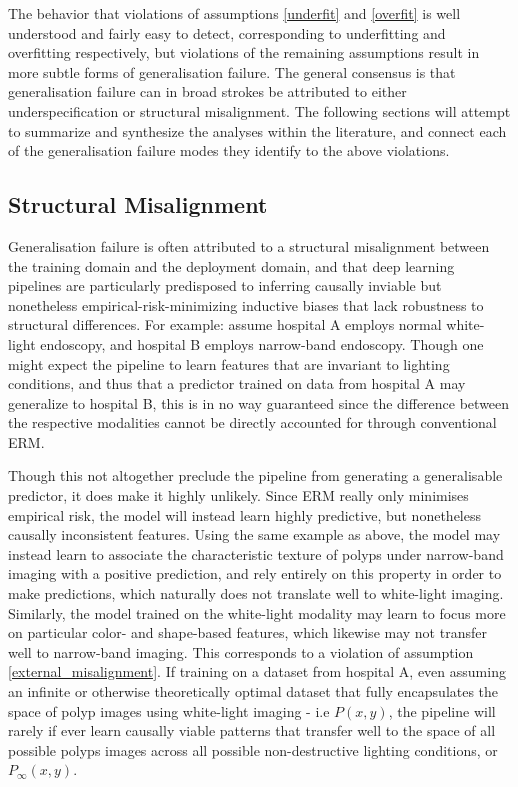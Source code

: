 		The behavior that violations of assumptions \ref{underfit} and \ref{overfit} is well understood and fairly easy to detect, corresponding to underfitting and overfitting respectively, but violations of the remaining assumptions result in more subtle forms of generalisation failure. The general consensus is that generalisation failure can in broad strokes be attributed to either underspecification or structural misalignment. The following sections will attempt to summarize and synthesize the analyses within the literature, and connect each of the generalisation failure modes they identify to the above violations.
		
		\subsection{Structural Misalignment}
		Generalisation failure is often attributed to a structural misalignment between the training domain and the deployment domain, and that deep learning pipelines are particularly predisposed to inferring causally inviable but nonetheless empirical-risk-minimizing inductive biases that lack robustness to structural differences. For example: assume hospital A employs normal white-light endoscopy, and hospital B employs narrow-band endoscopy. Though one might expect the pipeline to learn features that are invariant to lighting conditions, and thus that a predictor trained on data from hospital A may generalize to hospital B, this is in no way guaranteed since the difference between the respective modalities cannot be directly accounted for through conventional ERM. 
		
		Though this not altogether preclude the pipeline from generating a generalisable predictor, it does make it highly unlikely. Since ERM really only minimises empirical risk, the model will instead learn highly predictive, but nonetheless causally inconsistent features. Using the same example as above, the model may instead learn to associate the characteristic texture of polyps under narrow-band imaging with a positive prediction, and rely entirely on this property in order to make predictions, which naturally does not translate well to white-light imaging. Similarly, the model trained on the white-light modality may learn to focus more on particular color- and shape-based features, which likewise may not transfer well to narrow-band imaging. This corresponds to a violation of assumption \ref{external_misalignment}. If training on a dataset from hospital A, even assuming an infinite or otherwise theoretically optimal dataset that fully encapsulates the space of polyp images using white-light imaging - i.e \(P(x,y)\), the pipeline will rarely if ever learn causally viable patterns that transfer well to the space of all possible polyps images across all possible non-destructive lighting conditions, or \(P_{\infty}(x,y)\). 


